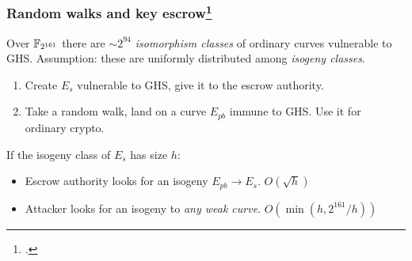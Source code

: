 \documentclass{beamer}
\begin{document}
\begin{frame}
  \frametitle{Random walks and key escrow\footcite{teske06}}

  \begin{center}
  \end{center}

  Over \emph{$\mathbb{F}_{2^{161}}$} there are \emph{$\sim 2^{94}$ isomorphism
    classes} of ordinary curves vulnerable to GHS. \alert{Assumption:}
  these are uniformly distributed among \emph{isogeny classes}.
  \begin{enumerate}
  \item Create \emph{$E_s$} \alert{vulnerable to GHS}, give it to
    the escrow authority.
  \item Take a random walk, land on a curve \emph{$E_{pb}$} \alert{immune
      to GHS}. Use it for ordinary crypto.
  \end{enumerate}

  If the isogeny class of \emph{$E_s$} has size \alert{$h$}:
  \begin{itemize}
  \item Escrow authority looks for an isogeny \emph{$E_{pb}\to
      E_s$}. \hfill\alert{$O(\sqrt{h})$}
  \item Attacker looks for an isogeny to \emph{any weak
      curve}. \hfill\alert{$O(\min(h,2^{161}/h))$}
  \end{itemize}
\end{frame}

\end{document}
